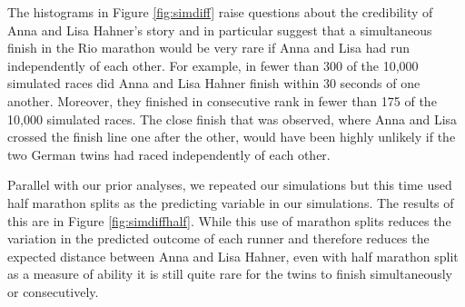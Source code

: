 \documentclass[12pt,titlepage]{article}
\begin{document}
The histograms in Figure \ref{fig:simdiff} raise questions about the
credibility of Anna and Lisa Hahner's story and in particular suggest
that a simultaneous finish in the Rio marathon would be very rare if
Anna and Lisa had run independently of each other. For example, in
fewer than 300 of the 10,000 simulated races did Anna and Lisa Hahner
finish within 30 seconds of one another. Moreover, they finished in
consecutive rank in fewer than 175 of the 10,000 simulated races.  The
close finish that was observed, where Anna and Lisa crossed the finish
line one after the other, would have been highly unlikely if the two
German twins had raced independently of each other.

Parallel with our prior analyses, we repeated our simulations but this
time used half marathon splits as the predicting variable in our
simulations. The results of this are in Figure \ref{fig:simdiffhalf}.
While this use of marathon splits reduces the variation in the
predicted outcome of each runner and therefore reduces the expected
distance between Anna and Lisa Hahner, even with half marathon split
as a measure of ability it is still quite rare for the twins to finish
simultaneously or consecutively.
\end{document}
